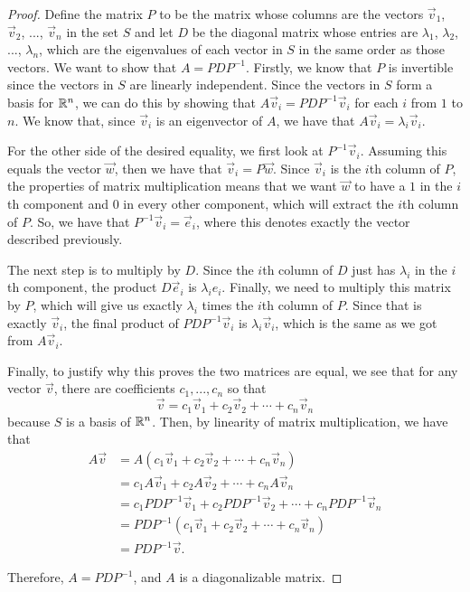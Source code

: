 \documentclass{ximera}
\begin{document}
\begin{proof}
Define the matrix $P$ to be the matrix whose columns are the vectors $\vec{v}_1$, $\vec{v}_2$, ..., $\vec{v}_n$ in the set $S$ and let $D$ be the diagonal matrix whose entries are $\lambda_1$, $\lambda_2$, ..., $\lambda_n$, which are the eigenvalues of each vector in $S$ in the same order as those vectors. We want to show that $A = PDP^{-1}$. Firstly, we know that $P$ is invertible since the vectors in $S$ are linearly independent. Since the vectors in $S$ form a basis for $\mathbb{R}^n$, we can do this by showing that $A\vec{v}_i = PDP^{-1}\vec{v}_i$ for each $i$ from $1$ to $n$. We know that, since $\vec{v}_i$ is an eigenvector of $A$, we have that $A\vec{v}_i = \lambda_i\vec{v}_i$. 

For the other side of the desired equality, we first look at $P^{-1}\vec{v}_i$. Assuming this equals the vector $\vec{w}$, then we have that $\vec{v}_i = P\vec{w}$. Since $\vec{v}_i$ is the $i$th column of $P$, the properties of matrix multiplication means that we want $\vec{w}$ to have a $1$ in the $i$th component and $0$ in every other component, which will extract the $i$th column of $P$. So, we have that $P^{-1}\vec{v}_i = \vec{e}_i$, where this denotes exactly the vector described previously.

The next step is to multiply by $D$. Since the $i$th column of $D$ just has $\lambda_i$ in the $i$th component, the product $D\vec{e}_i$ is $\lambda_ie_i$. Finally, we need to multiply this matrix by $P$, which will give us exactly $\lambda_i$ times the $i$th column of $P$. Since that is exactly $\vec{v}_i$, the final product of $PDP^{-1}\vec{v}_i$ is $\lambda_i\vec{v}_i$, which is the same as we got from $A\vec{v}_i$.  

Finally, to justify why this proves the two matrices are equal, we see that for any vector $\vec{v}$, there are coefficients $c_1, ..., c_n$ so that
\[ 
    \vec{v} = c_1\vec{v}_1 + c_2\vec{v}_2 + \cdots + c_n\vec{v}_n 
\] 
because $S$ is a basis of $\mathbb{R}^n$. Then, by linearity of matrix multiplication, we have that
\[ 
    \begin{split}
        A\vec{v} &= A\left(c_1\vec{v}_1 + c_2\vec{v}_2 + \cdots + c_n\vec{v}_n\right) \\
        &= c_1A\vec{v}_1 + c_2A\vec{v}_2 + \cdots + c_nA\vec{v}_n \\
        &= c_1PDP^{-1}\vec{v}_1 + c_2PDP^{-1}\vec{v}_2 + \cdots + c_nPDP^{-1}\vec{v}_n \\
        &= PDP^{-1}\left(c_1\vec{v}_1 + c_2\vec{v}_2 + \cdots + c_n\vec{v}_n\right) \\
        &= PDP^{-1}\vec{v}.
    \end{split}
\]

Therefore, $A = PDP^{-1}$, and $A$ is a diagonalizable matrix.
\end{proof}
\end{document}
